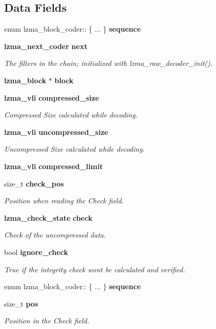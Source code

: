 \subsection*{Data Fields}
\begin{DoxyCompactItemize}
\item 
\mbox{\label{structlzma__block__coder_a481422b69edf1e9882da38686dedfb4f}} 
enum lzma\+\_\+block\+\_\+coder\+:: \{ ... \}  {\bfseries sequence}
\item 
\textbf{ lzma\+\_\+next\+\_\+coder} \textbf{ next}
\begin{DoxyCompactList}\small\item\em The filters in the chain; initialized with lzma\+\_\+raw\+\_\+decoder\+\_\+init(). \end{DoxyCompactList}\item 
\textbf{ lzma\+\_\+block} $\ast$ \textbf{ block}
\item 
\textbf{ lzma\+\_\+vli} \textbf{ compressed\+\_\+size}
\begin{DoxyCompactList}\small\item\em Compressed Size calculated while decoding. \end{DoxyCompactList}\item 
\textbf{ lzma\+\_\+vli} \textbf{ uncompressed\+\_\+size}
\begin{DoxyCompactList}\small\item\em Uncompressed Size calculated while decoding. \end{DoxyCompactList}\item 
\textbf{ lzma\+\_\+vli} \textbf{ compressed\+\_\+limit}
\item 
size\+\_\+t \textbf{ check\+\_\+pos}
\begin{DoxyCompactList}\small\item\em Position when reading the Check field. \end{DoxyCompactList}\item 
\textbf{ lzma\+\_\+check\+\_\+state} \textbf{ check}
\begin{DoxyCompactList}\small\item\em Check of the uncompressed data. \end{DoxyCompactList}\item 
bool \textbf{ ignore\+\_\+check}
\begin{DoxyCompactList}\small\item\em True if the integrity check won\textquotesingle{}t be calculated and verified. \end{DoxyCompactList}\item 
\mbox{\label{structlzma__block__coder_a4a860b7c1d308f1004f1c85ebf2ecf89}} 
enum lzma\+\_\+block\+\_\+coder\+:: \{ ... \}  {\bfseries sequence}
\item 
size\+\_\+t \textbf{ pos}
\begin{DoxyCompactList}\small\item\em Position in the Check field. \end{DoxyCompactList}\end{DoxyCompactItemize}


